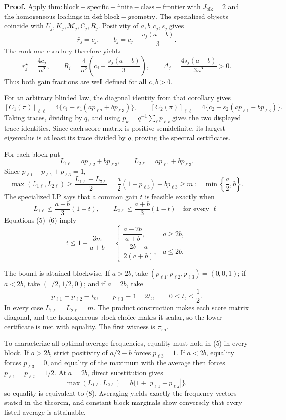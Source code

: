\textbf{Proof.}
Apply \(\mathrm{thm:block-specific-finite-class-frontier}\) with \(J_{\mathrm{blk}}=2\) and the homogeneous loadings in \(\mathrm{def:block-geometry}\). The specialized objects coincide with \(U_j,K_j,\mathcal M_j,C_j,R_j\). Positivity of \(a,b,c_j,s_j\) gives
\[
\bar r_j=c_j,
\qquad
b_j=c_j+\frac{s_j(a+b)}3.
\tag{1}
\]
The rank-one corollary therefore yields
\[
r_j^\star=\frac{4c_j}{n^2},
\qquad
B_j=\frac4{n^2}\left(c_j+\frac{s_j(a+b)}3\right),
\qquad
\Delta_j=\frac{4s_j(a+b)}{3n^2}>0.
\tag{2}
\]
Thus both gain fractions are well defined for all \(a,b>0\).

For an arbitrary blinded law, the diagonal identity from that corollary gives
\[
[C_1(\pi)]_{\ell\ell}
=4\{c_1+s_1(ap_{\ell2}+bp_{\ell3})\},
\qquad
[C_2(\pi)]_{\ell\ell}
=4\{c_2+s_2(ap_{\ell1}+bp_{\ell3})\}.
\tag{3}
\]
Taking traces, dividing by \(q\), and using \(p_k=q^{-1}\sum_\ell p_{\ell k}\) gives the two displayed trace identities.  Since each score matrix is positive semidefinite, its largest eigenvalue is at least its trace divided by \(q\), proving the spectral certificates.

For each block put
\[
L_{1\ell}=ap_{\ell2}+bp_{\ell3},
\qquad
L_{2\ell}=ap_{\ell1}+bp_{\ell3}.
\tag{4}
\]
Since \(p_{\ell1}+p_{\ell2}+p_{\ell3}=1\),
\[
\max(L_{1\ell},L_{2\ell})
\ge\frac{L_{1\ell}+L_{2\ell}}2
=\frac a2(1-p_{\ell3})+bp_{\ell3}
\ge m:=\min\left\{\frac a2,b\right\}.
\tag{5}
\]
The specialized LP says that a common gain \(t\) is feasible exactly when
\[
L_{1\ell}\le\frac{a+b}{3}(1-t),
\qquad
L_{2\ell}\le\frac{a+b}{3}(1-t)
\quad\text{for every }\ell.
\tag{6}
\]
Equations (5)--(6) imply
\[
t\le1-\frac{3m}{a+b}
=
\begin{cases}
\dfrac{a-2b}{a+b},&a\ge2b,\\[6pt]
\dfrac{2b-a}{2(a+b)},&a\le2b.
\end{cases}
\tag{7}
\]

The bound is attained blockwise. If \(a>2b\), take \((p_{\ell1},p_{\ell2},p_{\ell3})=(0,0,1)\); if \(a<2b\), take \((1/2,1/2,0)\); and if \(a=2b\), take
\[
p_{\ell1}=p_{\ell2}=t_\ell,
\qquad
p_{\ell3}=1-2t_\ell,
\qquad
0\le t_\ell\le\frac12.
\tag{8}
\]
In every case \(L_{1\ell}=L_{2\ell}=m\). The product construction makes each score matrix diagonal, and the homogeneous block choice makes it scalar, so the lower certificate is met with equality. The first witness is \(\pi_{\mathrm{sh}}\).

To characterize all optimal average frequencies, equality must hold in (5) in every block. If \(a>2b\), strict positivity of \(a/2-b\) forces \(p_{\ell3}=1\). If \(a<2b\), equality forces \(p_{\ell3}=0\), and equality of the maximum with the average then forces \(p_{\ell1}=p_{\ell2}=1/2\). At \(a=2b\), direct substitution gives
\[
\max(L_{1\ell},L_{2\ell})
=b\{1+|p_{\ell1}-p_{\ell2}|\},
\]
so equality is equivalent to (8). Averaging yields exactly the frequency vectors stated in the theorem, and constant block marginals show conversely that every listed average is attainable.

